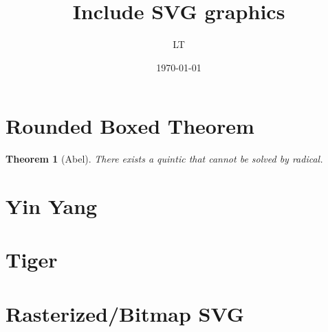 \documentclass{article}
\newtheorem{thm}{Theorem}
\begin{document}
\title{Include SVG graphics}
\author{LT}
\date{\today}
\maketitle

\section{Rounded Boxed Theorem}

\vspace{0.5cm}
\vspace{0.2cm}
\begin{thm}[Abel]
There exists a quintic that cannot be solved by radical.
\end{thm}
\vspace{0.5cm}

\section{Yin Yang}

\vspace{3cm}

\section{Tiger}

\vspace{10cm}

\section{Rasterized/Bitmap SVG}
\end{document}
